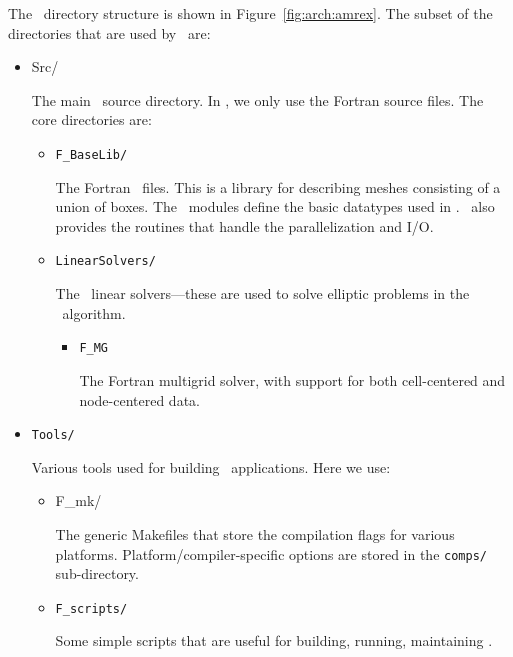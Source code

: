 The \amrex\ directory structure is shown in
Figure~\ref{fig:arch:amrex}.  The subset of the directories that are
used by \maestro\ are:
\begin{itemize}
\item {Src/}

  The main \amrex\ source directory.  In \maestro, we only use the
  Fortran source files.  The core directories are:

  \begin{itemize}

  \item {\tt F\_BaseLib/} 

    The Fortran \amrex\ files.  This is a library for describing
    meshes consisting of a union of boxes.  The \amrex\ modules
    define the basic datatypes used in \maestro.  \amrex\ also
    provides the routines that handle the parallelization and I/O.

  \item {\tt LinearSolvers/}

    The \amrex\ linear solvers---these are used to solve elliptic
    problems in the \maestro\ algorithm.

    \begin{itemize}

    \item {\tt F\_MG}

      The Fortran multigrid solver, with support for both
      cell-centered and node-centered data.

    \end{itemize}

  \end{itemize}

\item {\tt Tools/}

  Various tools used for building \amrex\ applications.  Here we use:

  \begin{itemize}

  \item {F\_mk/}

    The generic Makefiles that store the compilation flags for various
    platforms.  Platform/compiler-specific options are stored in the
    {\tt comps/} sub-directory.

  \item {\tt F\_scripts/}

    Some simple scripts that are useful for building, running,
    maintaining \maestro.

  \end{itemize}

\end{itemize}


